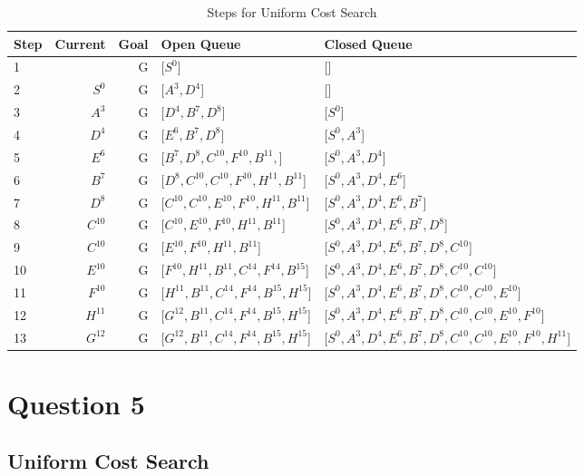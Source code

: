\documentclass{article}
\begin{document}
    \begin{table}[!htp]\centering
        \caption{Steps for Uniform Cost Search}\label{tab:ucs4}
        \scriptsize
        \begin{tabular}{lrrll}\toprule
        Step &Current &Goal & Open Queue &Closed Queue  \\\midrule
        1&  &G &[$S^0$] &[] \\
        2& $S^0$ &G &[$A^3, D^4$] &[] \\
        3& $A^3$ &G &[$D^4, B^7, D^8$] &[$S^0$] \\
        4& $D^4$ &G &[$E^6, B^7, D^8$] &[$S^0, A^3$] \\
        5& $E^6$ &G &[$B^7, D^8, C^{10}, F^{10}, B^{11},$] &[$S^0, A^3, D^4$] \\
        6& $B^7$ &G &[$D^8, C^{10}, C^{10}, F^{10}, H^{11}, B^{11}$] &[$S^0, A^3, D^4, E^6$] \\
        7& $D^8$ &G &[$C^{10}, C^{10}, E^{10}, F^{10}, H^{11}, B^{11}$] &[$S^0, A^3, D^4, E^6, B^7$] \\
        8& $C^{10}$ &G &[$C^{10}, E^{10}, F^{10}, H^{11}, B^{11}$] &[$S^0, A^3, D^4, E^6, B^7, D^8$] \\
        9& $C^{10}$ &G &[$E^{10}, F^{10}, H^{11}, B^{11}$] &[$S^0, A^3, D^4, E^6, B^7, D^8, C^{10}$] \\
        10& $E^{10}$ &G &[$F^{10}, H^{11}, B^{11}, C^{14}, F^{14}, B^{15}$] &[$S^0, A^3, D^4, E^6, B^7, D^8, C^{10}, C^{10}$] \\
        11& $F^{10}$ &G &[$H^{11}, B^{11}, C^{14}, F^{14}, B^{15}, H^{15}$] &[$S^0, A^3, D^4, E^6, B^7, D^8, C^{10}, C^{10}, E^{10}$] \\
        12& $H^{11}$ &G &[$G^{12}, B^{11}, C^{14}, F^{14}, B^{15}, H^{15}$] &[$S^0, A^3, D^4, E^6, B^7, D^8, C^{10}, C^{10}, E^{10}, F^{10}$] \\
        13& $G^{12}$ &G &[$G^{12}, B^{11}, C^{14}, F^{14}, B^{15}, H^{15}$] &[$S^0, A^3, D^4, E^6, B^7, D^8, C^{10}, C^{10}, E^{10}, F^{10}, H^{11}$] \\
        \end{tabular}
    \end{table}

\section{Question 5}
\subsection{Uniform Cost Search}
\end{document}
